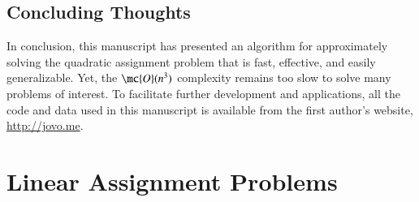 \documentclass[preprint,11pt]{elsarticle}
\begin{document}
\subsection{Concluding Thoughts}

In conclusion, this manuscript has presented an algorithm for approximately solving the quadratic assignment problem that is fast, effective, and easily generalizable.  Yet, the $\mc{O}(n^3)$ complexity remains too slow to solve many problems of interest.  To facilitate further development and applications, all the code and data used in this manuscript is available from the first author's website, \url{http://jovo.me}.




\appendix
\newpage

\clearpage
\section{Linear Assignment Problems} %

\end{document}

